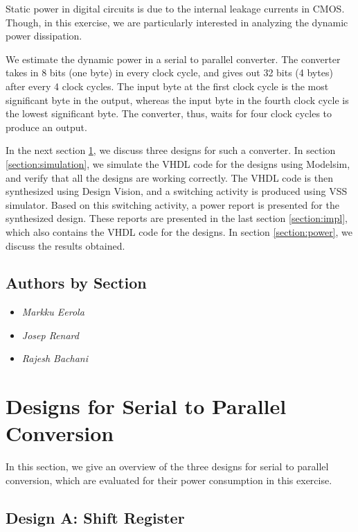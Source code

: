 \documentclass[11pt,a4paper]{article}
\begin{document}
Static power in digital circuits is due to the internal leakage currents in CMOS. Though, in this exercise, we are particularly interested in analyzing the dynamic power dissipation.

We estimate the dynamic power in a serial to parallel converter. The converter takes in 8 bits (one byte) in every clock cycle, and gives out 32 bits (4 bytes) after every 4 clock cycles. The input byte at the first clock cycle is the most significant byte in the output, whereas the input byte in the fourth clock cycle is the lowest significant byte. The converter, thus, waits for four clock cycles to produce an output.

In the next section \ref{section:designs}, we discuss three designs for such a converter. In section \ref{section:simulation}, we simulate the VHDL code for the designs using Modelsim, and verify that all the designs are working correctly. The VHDL code is then synthesized using Design Vision, and a switching activity is produced using VSS simulator. Based on this switching activity, a power report is presented for the synthesized design. These reports are presented in the last section \ref{section:impl}, which also contains the VHDL code for the designs. In section \ref{section:power}, we discuss the results obtained.

\subsection{Authors by Section}
\begin{itemize}
\item \textit{Markku Eerola} 
\item \textit{Josep Renard} 
\item \textit{Rajesh Bachani} 
\end{itemize}

\newpage
\section{Designs for Serial to Parallel Conversion}
\label{section:designs}
In this section, we give an overview of the three designs for serial to parallel conversion, which are evaluated for their power consumption in this exercise.

\subsection{Design A: Shift Register}
\end{document}
